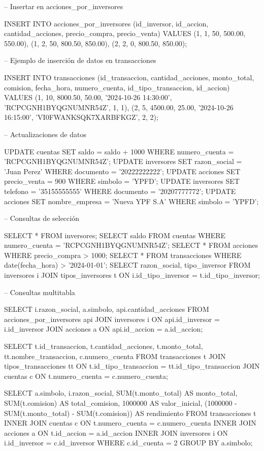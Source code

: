 -- Insertar en acciones_por_inversores

INSERT INTO acciones_por_inversores (id_inversor, id_accion, cantidad_acciones, precio_compra, precio_venta) 
VALUES 
(1, 1, 50, 500.00, 550.00),
(1, 2, 50, 800.50, 850.00),
(2, 2, 0, 800.50, 850.00);

-- Ejemplo de inserción de datos en transacciones

INSERT INTO transacciones (id_transaccion, cantidad_acciones, monto_total, comision, fecha_hora, numero_cuenta, id_tipo_transaccion, id_accion) 
VALUES 
(1, 10, 8000.50, 50.00, '2024-10-26 14:30:00', 'RCPCGNH1BYQGNUMNR54Z', 1, 1),
(2, 5, 4500.00, 25.00, '2024-10-26 16:15:00', 'VI0FWANKSQK7XARBFKGZ', 2, 2);

-- Actualizaciones de datos

UPDATE cuentas SET saldo = saldo + 1000 WHERE numero_cuenta = 'RCPCGNH1BYQGNUMNR54Z';
UPDATE inversores SET razon_social = 'Juan Perez' WHERE documento = '20222222222';
UPDATE acciones SET precio_venta = 900 WHERE simbolo = 'YPFD';
UPDATE inversores SET telefono = '35155555555' WHERE documento = '20207777772';
UPDATE acciones SET nombre_empresa = 'Nueva YPF S.A' WHERE simbolo = 'YPFD';

-- Consultas de selección

SELECT * FROM inversores;
SELECT saldo FROM cuentas WHERE numero_cuenta = 'RCPCGNH1BYQGNUMNR54Z';
SELECT * FROM acciones WHERE precio_compra > 1000;
SELECT * FROM transacciones WHERE date(fecha_hora) > '2024-01-01';
SELECT razon_social, tipo_inversor FROM inversores i JOIN tipos_inversores t ON i.id_tipo_inversor = t.id_tipo_inversor;

-- Consultas multitabla

SELECT i.razon_social, a.simbolo, api.cantidad_acciones 
FROM acciones_por_inversores api 
JOIN inversores i ON api.id_inversor = i.id_inversor 
JOIN acciones a ON api.id_accion = a.id_accion;

SELECT t.id_transaccion, t.cantidad_acciones, t.monto_total, tt.nombre_transaccion, c.numero_cuenta 
FROM transacciones t 
JOIN tipos_transacciones tt ON t.id_tipo_transaccion = tt.id_tipo_transaccion 
JOIN cuentas c ON t.numero_cuenta = c.numero_cuenta;

SELECT a.simbolo, i.razon_social,
       SUM(t.monto_total) AS monto_total,
       SUM(t.comision) AS total_comision,
       1000000 AS valor_inicial,
       (1000000 - SUM(t.monto_total) - SUM(t.comision)) AS rendimiento
FROM transacciones t 
INNER JOIN cuentas c ON t.numero_cuenta = c.numero_cuenta 
INNER JOIN acciones a ON t.id_accion = a.id_accion
INNER JOIN inversores i ON i.id_inversor = c.id_inversor
WHERE c.id_cuenta = 2
GROUP BY a.simbolo;      

